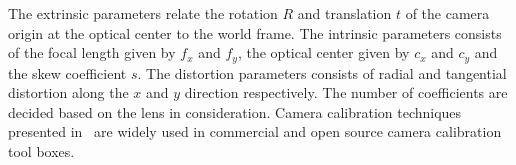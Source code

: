 The extrinsic parameters relate the rotation $R$ and translation $t$ of the camera origin at the optical center to the world frame. The intrinsic parameters consists of the focal length given by $f_x$ and $f_y$, the optical center given by $c_x$ and $c_y$ and the skew coefficient $s$. The distortion parameters consists of radial and tangential distortion along the $x$ and $y$ direction respectively. The number of coefficients are decided based on the lens in consideration. Camera calibration techniques presented in~\cite{zhang,bouguet2004camera,heikkila1997four} are widely used in commercial and open source camera calibration tool boxes.